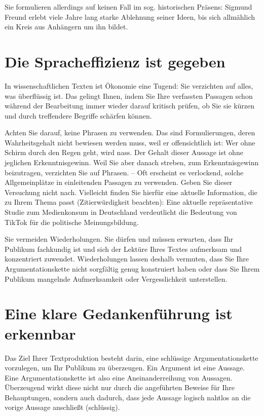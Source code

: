 Sie formulieren allerdings auf keinen Fall im sog. historischen Präsens: \glqq Sigmund Freund erlebt viele Jahre lang starke Ablehnung seiner Ideen, bis sich allmählich ein Kreis aus Anhängern um ihn bildet.\grqq{}

\section{Die Spracheffizienz ist gegeben}
\label{sec:spracheffizienz}

In wissenschaftlichen Texten ist Ökonomie eine Tugend: Sie verzichten auf alles, was überflüssig ist. Das gelingt Ihnen, indem Sie Ihre verfassten Passagen schon während der Bearbeitung immer wieder darauf kritisch prüfen, ob Sie sie kürzen und durch treffendere Begriffe schärfen können.

Achten Sie darauf, keine Phrasen zu verwenden. Das sind Formulierungen, deren Wahrheitsgehalt nicht bewiesen werden muss, weil er offensichtlich ist: \glqq Wer ohne Schirm durch den Regen geht, wird nass.\grqq{} Der Gehalt dieser Aussage ist ohne jeglichen Erkenntnisgewinn. Weil Sie aber danach streben, zum Erkenntnisgewinn beizutragen, verzichten Sie auf Phrasen. – Oft erscheint es verlockend, solche Allgemeinplätze in einleitenden Passagen zu verwenden. Geben Sie dieser Versuchung nicht nach. Vielleicht finden Sie hierfür eine aktuelle Information, die zu Ihrem Thema passt (Zitierwürdigkeit beachten): \glqq Eine aktuelle repräsentative Studie zum Medienkonsum in Deutschland verdeutlicht die Bedeutung von TikTok für die politische Meinungsbildung.\grqq{}

Sie vermeiden Wiederholungen. Sie dürfen und müssen erwarten, dass Ihr Publikum fachkundig ist und sich der Lektüre Ihres Textes aufmerksam und konzentriert zuwendet. Wiederholungen lassen deshalb vermuten, dass Sie Ihre Argumentationskette nicht sorgfältig genug konstruiert haben oder dass Sie Ihrem Publikum mangelnde Aufmerksamkeit oder Vergesslichkeit unterstellen.

\section{Eine klare Gedankenführung ist erkennbar}
\label{sec:gedankenfuehrung}

Das Ziel Ihrer Textproduktion besteht darin, eine schlüssige Argumentationskette vorzulegen, um Ihr Publikum zu überzeugen. Ein Argument ist eine Aussage. Eine Argumentationskette ist also eine Aneinanderreihung von Aussagen. Überzeugend wirkt diese nicht nur durch die angeführten Beweise für Ihre Behauptungen, sondern auch dadurch, dass jede Aussage logisch nahtlos an die vorige Aussage anschließt (schlüssig).

